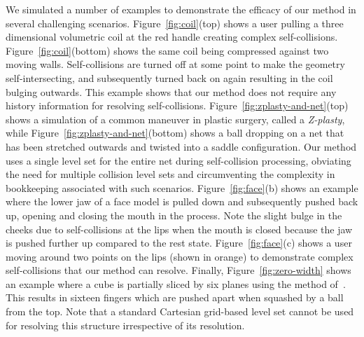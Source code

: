 We simulated a number of examples to demonstrate the efficacy of our
method in several challenging scenarios.
%
Figure~\ref{fig:coil}(top) shows a user pulling a three dimensional
volumetric coil at the red handle creating complex
self-collisions. Figure~\ref{fig:coil}(bottom) shows the same coil
being compressed against two moving walls. Self-collisions are turned
off at some point to make the geometry self-intersecting, and
subsequently turned back on again resulting in the coil bulging
outwards. This example shows that our method does not require any
history information for resolving self-collisions.
%
Figure~\ref{fig:zplasty-and-net}(top) shows a simulation of a common
maneuver in plastic surgery, called a \emph{Z-plasty}, while
Figure~\ref{fig:zplasty-and-net}(bottom) shows a ball dropping on a
net that has been stretched outwards and twisted into a saddle
configuration. Our method uses a single level set for the entire net
during self-collision processing, obviating the need for multiple
collision level sets and circumventing the complexity in bookkeeping
associated with such scenarios.
%
Figure~\ref{fig:face}(b) shows an example where the lower jaw of a
face model is pulled down and subsequently pushed back up, opening and
closing the mouth in the process. Note the slight bulge in the cheeks
due to self-collisions at the lips when the mouth is closed because
the jaw is pushed further up compared to the rest state.
Figure~\ref{fig:face}(c) shows a user moving around two points on the
lips (shown in orange) to demonstrate complex self-collisions that our
method can resolve.
%
Finally, Figure~\ref{fig:zero-width} shows an example where a cube is
partially sliced by six planes using the method
of~\citep{SifakDF:2007}. This results in sixteen fingers which are
pushed apart when squashed by a ball from the top. Note that a
standard Cartesian grid-based level set cannot be used for resolving
this structure irrespective of its resolution.



\renewcommand{\arraystretch}{.8}
\setlength{\tabcolsep}{3pt}


